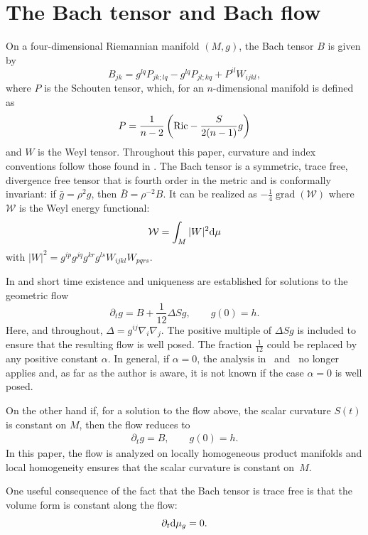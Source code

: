 \documentclass[10pt,a4paper]{amsart}
\numberwithin{equation}{section}
\newcommand{\dvar}[1]{\partial_{#1}} %
\newcommand{\grad}{\operatorname{grad}} %
\begin{document}
\section{The Bach tensor and Bach flow} \label{Bachbackgroundsec}

On a four-dimensional Riemannian manifold $(M, g)$, the Bach tensor $B$ is given by
\[
B_{jk} = g^{lq} P_{jk;lq} - g^{lq} P_{jl;kq} + P^{il} W_{ijkl},
\]
where $P$ is the Schouten tensor, which, for an $n$-dimensional manifold is defined as
\[
P = \frac{1}{n-2}\left({\rm Ric}- \frac{S}{2(n-1)}g \right)
\]
and $W$ is the Weyl tensor. Throughout this paper, curvature and index conventions follow those found in \cite{Jack3}. The Bach tensor is a symmetric, trace free, divergence free tensor that is fourth order in the metric and is conformally invariant: if $\bar{g} = \rho^2 g$, then $\bar{B} = \rho^{-2} B$. It can be realized as $-\frac{1}{4} \grad(\mathcal{W})$ where $\mathcal{W}$ is the Weyl energy functional:
\[
\mathcal{W} = \int_M |W|^2 {\rm d} \mu
\]
with $|W|^2 = g^{ip} g^{jq} g^{kr} g^{ls} W_{ijkl} W_{pqrs}$.

In \cite{BahuaudHelliwell1} and \cite{BahuaudHelliwell2} short time existence and uniqueness are established for solutions to the geometric flow
\begin{equation*}
\dvar{t} g = B + \frac{1}{12} \Delta S g, \qquad g(0) = h.
\end{equation*}
Here, and throughout, $\Delta = g^{ij} \nabla_i \nabla_j$. The positive multiple of $\Delta S g$ is included to ensure that the resulting flow is well posed. The fraction $\frac{1}{12}$ could be replaced by any positive constant $\alpha$. In general, if $\alpha = 0$, the analysis in~\cite{BahuaudHelliwell1} and~\cite{BahuaudHelliwell2} no longer applies and, as far as the author is aware, it is not known if the case $\alpha = 0$ is well posed.

On the other hand if, for a solution to the flow above, the scalar curvature $S(t)$ is constant on $M$, then the flow reduces to
\begin{gather} \label{bachfloweqn}
\dvar{t} g = B, \qquad
g(0) = h.
\end{gather}
In this paper, the flow is analyzed on locally homogeneous product manifolds and local homogeneity ensures that the scalar curvature is constant on~$M$.

One useful consequence of the fact that the Bach tensor is trace free is that the volume form is constant along the flow:
\[
\dvar{t}{\rm d} \mu_g = 0.
\]
\end{document}
